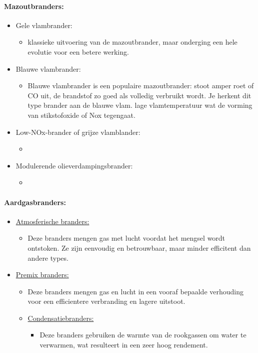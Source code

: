 \documentclass[12pt]{article}
\begin{document}
\paragraph{Mazoutbranders:}
\begin{itemize}
    \item Gele vlambrander:\begin{itemize}
        \item klassieke uitvoering van de mazoutbrander, maar onderging een hele evolutie voor een betere werking.
    \end{itemize}
    \item Blauwe vlambrander:\begin{itemize}
        \item Blauwe vlambrander is een populaire mazoutbrander: stoot amper roet of CO uit, de brandstof zo goed als volledig verbruikt wordt. Je herkent dit type brander aan de blauwe vlam. lage vlamtemperatuur wat de vorming van stikstofoxide of Nox tegengaat.
    \end{itemize}
    \item Low-NOx-brander of grijze vlamblander:\begin{itemize}
        \item %
    \end{itemize}
    \item Modulerende olieverdampingsbrander:\begin{itemize}
        \item %
    \end{itemize}
\end{itemize}
\paragraph{Aardgasbranders:}
\begin{itemize}
    \item \underline{Atmosferische branders:}\begin{itemize}
        \item Deze branders mengen gas met lucht voordat het mengsel wordt ontstoken. Ze zijn eenvoudig en betrouwbaar, maar minder efficitent dan andere types.
    \end{itemize}
    \item \underline{Premix branders:}\begin{itemize}
        \item Deze branders mengen gas en lucht in een vooraf bepaalde verhouding voor een efficientere verbranding en lagere uitstoot.
    \item \underline{Condensatiebranders:}\begin{itemize}
        \item Deze branders gebruiken de warmte van de rookgassen om water te verwarmen, wat resulteert in een zeer hoog rendement.
    \end{itemize}
    \end{itemize}
\end{itemize}
\end{document}
